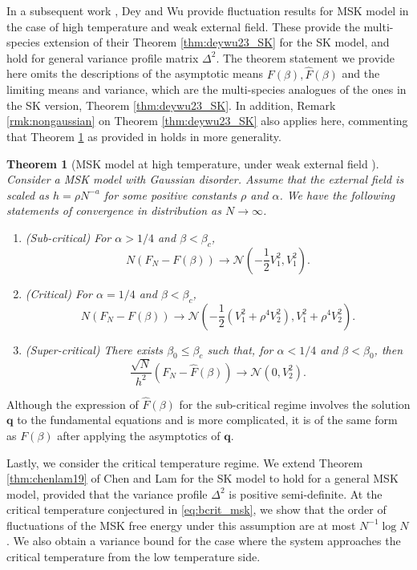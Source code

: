 \documentclass[11pt]{article}
\numberwithin{equation}{section}
\def \a {\alpha}
\def \b {\beta}
\def \cN {\mathcal{N}}
\newtheorem{theorem}{Theorem}[section]
\theoremstyle{remark}
\begin{document}
In a subsequent work \cite{DeyWu23}, Dey and Wu provide fluctuation results for MSK model in the case of high temperature and weak external field. These provide the multi-species extension of their Theorem \ref{thm:deywu23_SK} for the SK model, and hold for general variance profile matrix $\Delta^2$. The theorem statement we provide here omits the descriptions of the asymptotic means $F(\b), \widehat{F}(\b)$ and the limiting means and variance, which are the multi-species analogues of the ones in the SK version, Theorem \ref{thm:deywu23_SK}. In addition, Remark \ref{rmk:nongaussian} on Theorem \ref{thm:deywu23_SK} also applies here, commenting that Theorem \ref{thm:msk_weakext} as provided in \cite{DeyWu23} holds in more generality.

\begin{theorem}[MSK model at high temperature, under weak external field  ]\label{thm:msk_weakext}
Consider a MSK model with Gaussian disorder. Assume that the external field is scaled as $h = \rho N^{-a}$ for some positive constants $\rho$ and $\a$. We have the following statements of convergence in distribution as $N \to \infty$.
\begin{enumerate}
     \item (Sub-critical) For $\a>1/4$ and $\b<\b_c$,
        \[
        N \left(F_N - F(\b) \right) \to \cN(-\frac12 V_1^2, V_1^2).
        \]
        \item (Critical) For $\a=1/4$ and $\b<\b_c$,
        \[
        N \left(F_N - F(\b) \right) \to \cN(-\frac12 \left(V_1^2 + \rho^4 V_2^2 \right), V_1^2+\rho^4 V_2^2).
        \]
        \item (Super-critical) There exists $\b_0\leq \b_c$ such that, for $\a<1/4$ and $\b<\b_0$, then 
        \[
        \frac{\sqrt{N}}{h^2}\left(F_N - \widehat{F}(\b)\right) \to \cN(0, V_2^2).
        \]
\end{enumerate}
\end{theorem}
Although the expression of $\widehat{F}(\b)$ for the sub-critical regime involves the solution $\boldsymbol{q}$ to the fundamental equations and is more complicated, it is of the same form as $F(\b)$ after applying the asymptotics of $\boldsymbol{q}$. 

Lastly, we consider the critical temperature regime. We extend Theorem \ref{thm:chenlam19} of Chen and Lam for the SK model to hold for a general MSK model, provided that the variance profile $\Delta^2$ is positive semi-definite. At the critical temperature conjectured in \eqref{eq:bcrit_msk}, we show that the order of fluctuations of the MSK free energy under this assumption are at most $N^{-1}\log N$. We also obtain a variance bound for the case where the system approaches the critical temperature from the low temperature side.
\end{document}
